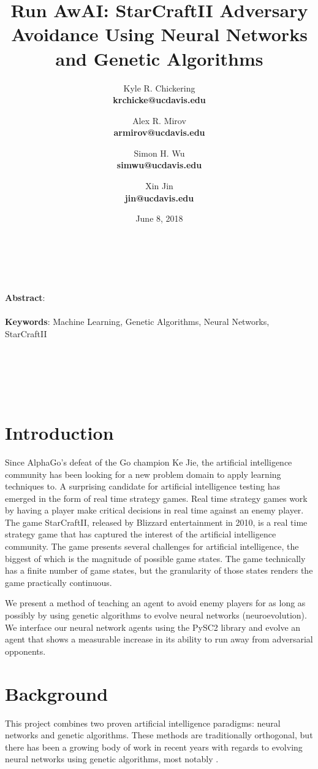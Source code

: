 \documentclass{article}
\title{Run AwAI: StarCraftII Adversary Avoidance Using Neural Networks and
  Genetic Algorithms}
\author{
    Kyle R. Chickering \\ {\footnotesize\textbf{krchicke@ucdavis.edu}}
    \and Alex R. Mirov \\ {\footnotesize\textbf{armirov@ucdavis.edu}}
    \and Simon H. Wu \\   {\footnotesize\textbf{simwu@ucdavis.edu}}
    \and Xin Jin \\       {\footnotesize\textbf{jin@ucdavis.edu}}
}
\date{June 8, 2018}
\renewenvironment{abstract}
{
\begin{changemargin}{0.5in}{0.5in}
}
{
\end{changemargin}
}
\begin{document}
\maketitle
\hline
\\~\\

\begin{abstract}
  \textbf{Abstract}: \blindtext
  \\~\\
  \textbf{Keywords}: Machine Learning, Genetic Algorithms, Neural Networks,
  StarCraftII
\end{abstract}
\\~\\
\hline
\\~\\

\section{Introduction}
Since AlphaGo's defeat of the Go champion Ke Jie, the artificial intelligence
community has
been looking for a new problem domain to apply learning techniques to. A
surprising candidate for artificial intelligence testing has
emerged in the form of real time strategy games. Real time strategy games work
by having a player make critical decisions in real time against an enemy
player. The game StarCraftII, released by Blizzard entertainment in 2010, is a
real time strategy
game that has captured the interest of the artificial intelligence community.
The game presents several challenges for artificial intelligence, the biggest of
which is the magnitude of possible game states. The game technically has a
finite number of game states, but the granularity of those states renders the
game practically continuous.

We present a method of teaching an agent to avoid enemy players for as long as
possibly by using genetic algorithms to evolve neural networks (neuroevolution).
We interface our neural network agents using the PySC2 library and evolve an
agent that shows a measurable increase in its ability to run away from
adversarial opponents.

\section{Background}
This project combines two proven artificial intelligence paradigms: neural
networks and genetic algorithms. These methods are traditionally orthogonal,
but there has been a growing body of work in recent years with regards to
evolving neural networks using genetic algorithms, most notably \cite{NEAT}.
\end{document}
